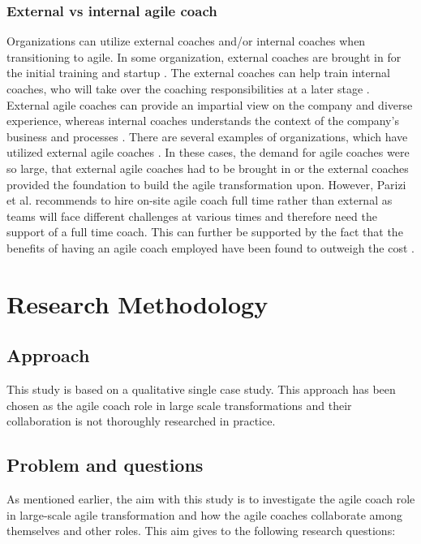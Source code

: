 \documentclass[11pt,a4paper]{report}
\begin{document}
\subsection{External vs internal agile coach}
Organizations can utilize external coaches and/or internal coaches when transitioning to agile. In some organization, external coaches are brought in for the initial training and startup \cite{litReviewACRole}. The external coaches can help train internal coaches, who will take over the coaching responsibilities at a later stage \cite{litReviewACRole}. External agile coaches can provide an impartial view on the company and diverse experience, whereas internal coaches understands the context of the company’s business and processes \cite{o2014assessing}. 
There are several examples of organizations, which have utilized external agile coaches \cite{hanly2006agile} \cite{fry2007large} \cite{benefield2008rolling}. In these cases, the demand for agile coaches were so large, that external agile coaches had to be brought in or the external coaches provided the foundation to build the agile transformation upon. 
However, Parizi et al. \cite{parizi2014hidden} recommends to hire on-site agile coach full time rather than external as teams will face different challenges at various times and therefore need the support of a full time coach. This can further be supported by the fact that the benefits of having an agile coach employed have been found to outweigh the cost \cite{o2014assessing}.

\chapter{Research Methodology}
\section{Approach}
This study is based on a qualitative single case study. This approach has been chosen as the agile coach role in large scale transformations and their collaboration is not thoroughly researched in practice\cite{litReviewACRole}.
\section{Problem and questions}
As mentioned earlier, the aim with this study is to investigate the agile coach role in large-scale agile transformation and how the agile coaches collaborate among themselves and other roles. This aim gives to the following research questions:
\newline
\end{document}
